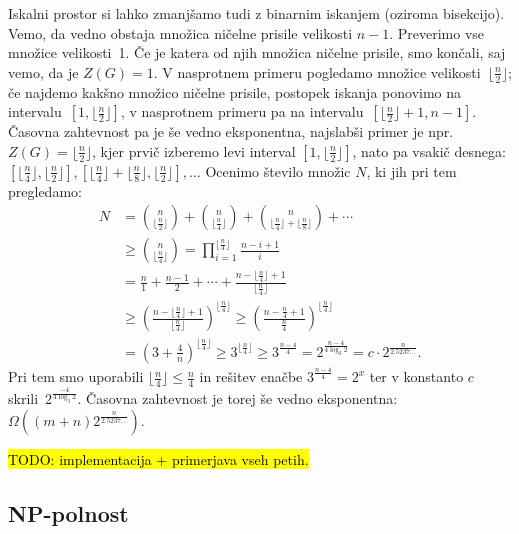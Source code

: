 \documentclass[12pt,a4paper,twoside]{article}
\theoremstyle{definition} %
\theoremstyle{plain} %
\numberwithin{equation}{section}  %
\begin{document}
Iskalni prostor si lahko zmanjšamo tudi z binarnim iskanjem (oziroma bisekcijo). Vemo, da vedno obstaja množica ničelne prisile velikosti $n-1$. Preverimo vse množice velikosti~1. Če je katera od njih množica ničelne prisile, smo končali, saj vemo, da je $Z(G) = 1$. V nasprotnem primeru pogledamo množice velikosti~$\lfloor \frac{n}{2} \rfloor$; če najdemo kakšno množico ničelne prisile, postopek iskanja ponovimo na intervalu~$[1,\lfloor \frac{n}{2} \rfloor]$, v nasprotnem primeru pa na intervalu~$[\lfloor \frac{n}{2} \rfloor + 1, n-1]$. 
Časovna zahtevnost pa je še vedno eksponentna, najslabši primer je npr.~$Z(G) = \lfloor \frac{n}{2} \rfloor$, kjer prvič izberemo levi interval $[1,\lfloor \frac{n}{2} \rfloor]$, nato pa vsakič desnega: $[\lfloor \frac{n}{4} \rfloor, \lfloor \frac{n}{2} \rfloor], [\lfloor \frac{n}{4} \rfloor + \lfloor \frac{n}{8} \rfloor, \lfloor \frac{n}{2} \rfloor], \ldots$ Ocenimo število množic $N$, ki jih pri tem pregledamo:
\begin{align*}
N &= \binom{n}{\lfloor \frac{n}{2} \rfloor} + \binom{n}{\lfloor \frac{n}{4} \rfloor} + \binom{n}{\lfloor \frac{n}{4} \rfloor + \lfloor \frac{n}{8} \rfloor}  + \cdots \\
&\geq   \binom{n}{\lfloor \frac{n}{4} \rfloor} = \prod_{i=1}^{\lfloor \frac{n}{4} \rfloor} \frac{n - i + 1}{i}  \\
&= \frac{n}{1} + \frac{n - 1}{2} + \cdots + \frac{n - \lfloor \frac{n}{4} \rfloor + 1}{\lfloor \frac{n}{4} \rfloor} \\
&\geq \left( \frac{n - \lfloor \frac{n}{4} \rfloor + 1}{\lfloor \frac{n}{4} \rfloor} \right)^{\lfloor \frac{n}{4} \rfloor} \geq  \left( \frac{n - \frac{n}{4} + 1}{\frac{n}{4}} \right)^{\lfloor \frac{n}{4} \rfloor} \\
&= \left( 3 +  \frac{4}{n} \right)^{\lfloor \frac{n}{4} \rfloor} \geq 3^{\lfloor \frac{n}{4} \rfloor} \geq 3^\frac{n-4}{4} = 2^\frac{n-4}{4 \log_3 2}= c \cdot 2^\frac{n}{2.5237\ldots}.
\end{align*}
Pri tem smo uporabili $\lfloor \frac{n}{4} \rfloor \leq \frac{n}{4}$ in rešitev enačbe $3^\frac{n-4}{4} = 2^x$ ter v konstanto $c$ skrili~$2^\frac{-4}{4\log_3 2}$. Časovna zahtevnost je torej še vedno eksponentna: $\Omega((m+n) 2^\frac{n}{2.5237\ldots})$.

\hl{TODO: implementacija + primerjava vseh petih.}

\subsection{NP-polnost}
\label{subsec:np-polnost}
\end{document}
